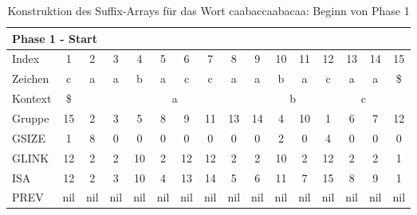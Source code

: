 \begin{table}[H]
\centering
\begin{adjustbox}{max width=\textwidth}
\begin{tabular}{lccccccccccccccc}
\multicolumn{16}{l}{Phase 1 - Start}                                                                                                                                                         \\ \hline
\multicolumn{1}{l|}{Index}   & 1                       & 2   & 3   & 4   & 5   & 6   & 7   & 8   & 9                       & 10  & 11                      & 12  & 13  & 14  & 15  \\
\multicolumn{1}{l|}{Zeichen} & c                       & a   & a   & b   & a   & c   & c   & a   & a                       & b   & a                       & c   & a   & a   & \$  \\ \cline{1-16}
\multicolumn{1}{l|}{Kontext} & \multicolumn{1}{c|}{\$} & \multicolumn{8}{c|}{a}                                            & \multicolumn{2}{c|}{b}        & \multicolumn{4}{c}{c} \\
\multicolumn{1}{l|}{Gruppe}      & \multicolumn{1}{c|}{15} & 2   & 3   & 5   & 8   & 9   & 11  & 13  & \multicolumn{1}{c|}{14} & 4   & \multicolumn{1}{c|}{10} & 1   & 6   & 7   & 12  \\
\multicolumn{1}{l|}{GSIZE}   & \multicolumn{1}{c|}{1}  & 8   & 0   & 0   & 0   & 0   & 0   & 0   & \multicolumn{1}{c|}{0}  & 2   & \multicolumn{1}{c|}{0}  & 4   & 0   & 0   & 0   \\
\multicolumn{1}{l|}{GLINK}   & 12                      & 2   & 2   & 10  & 2   & 12  & 12  & 2   & 2                       & 10  & 2                       & 12  & 2   & 2   & 1   \\
\multicolumn{1}{l|}{ISA}     & 12                      & 2   & 3   & 10  & 4   & 13  & 14  & 5   & 6                       & 11  & 7                       & 15  & 8   & 9   & 1   \\
\multicolumn{1}{l|}{PREV}    & nil                     & nil & nil & nil & nil & nil & nil & nil & nil                     & nil & nil                     & nil & nil & nil & nil
\end{tabular}
\end{adjustbox}

\caption[Konstruktion des Suffix-Arrays für das Wort caabaccaabacaa: Beginn von Phase 1]{Konstruktion des Suffix-Arrays für das Wort caabaccaabacaa: Beginn von Phase 1}
\label{table_complex_example_1_start} 
\end{table}

